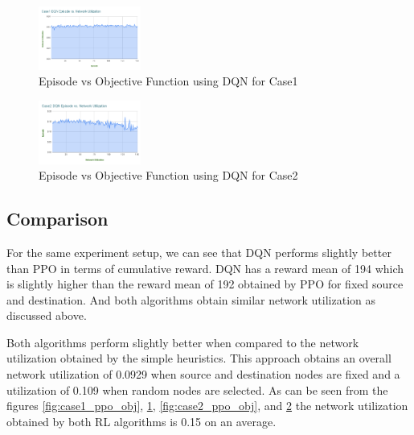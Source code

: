 \documentclass[conference]{IEEEtran}
\begin{document}
\vspace{\baselineskip}
\begin{figure}[h]
    \centering
    \includegraphics[width=0.3\textwidth]{Figures/Case1 DQN Episode vs. Network Utilization.png}
    \caption{Episode vs Objective Function using DQN for Case1}
    \label{fig:case1_dqn_obj}
\end{figure}

\vspace{\baselineskip}
\begin{figure}[h]
    \centering
    \includegraphics[width=0.3\textwidth]{Figures/Case2 DQN Episode vs. Network Utilization.png}
    \caption{Episode vs Objective Function using DQN for Case2}
    \label{fig:case2_dqn_obj}
\end{figure}

\subsection{Comparison}
\vspace{0.5em}
For the same experiment setup, we can see that DQN performs slightly better than PPO in terms of cumulative reward. DQN has a reward mean of 194 which is slightly higher than the reward mean of 192 obtained by PPO for fixed source and destination. And both algorithms obtain similar network utilization as discussed above.

\vspace{0.5em}
Both algorithms perform slightly better when compared to the network utilization obtained by the simple heuristics. This approach obtains an overall network utilization of 0.0929 when source and destination nodes are fixed and a utilization of 0.109 when random nodes are selected. As can be seen from the figures \ref{fig:case1_ppo_obj},  \ref{fig:case1_dqn_obj}, \ref{fig:case2_ppo_obj}, and \ref{fig:case2_dqn_obj} the network utilization obtained by both RL algorithms is 0.15 on an average.



\end{document}
